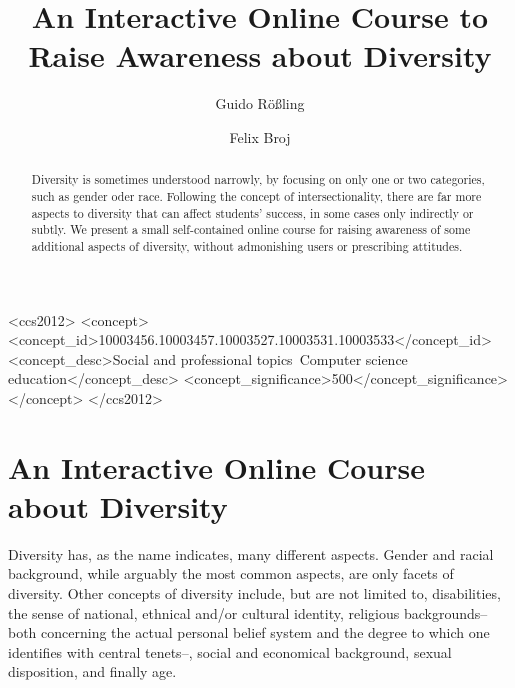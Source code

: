 \documentclass[sigconf]{acmart}
\begin{document}

\title{An Interactive Online Course to Raise Awareness about Diversity}

\author{Guido R\"o\ss{}ling}
\author{Felix Broj}
\begin{CCSXML}
<ccs2012>
<concept>
<concept_id>10003456.10003457.10003527.10003531.10003533</concept_id>
<concept_desc>Social and professional topics~Computer science education</concept_desc>
<concept_significance>500</concept_significance>
</concept>
</ccs2012>
\end{CCSXML}


\begin{abstract}
Diversity is sometimes understood narrowly, by focusing on only one or two categories, such as gender oder race.
Following the concept of intersectionality, there are far more aspects to diversity that can affect students' success,
in some cases only indirectly or subtly. We present a small self-contained online course for raising awareness of
some additional aspects of diversity, without admonishing users or prescribing attitudes.
\end{abstract}

\maketitle

\section{An Interactive Online Course about Diversity}

Diversity has, as the name indicates, many different aspects. Gender and racial background, while arguably the most
common aspects, are only facets of diversity. Other concepts of diversity include, but are not limited to, disabilities, the sense of
national, ethnical and/or cultural identity, religious backgrounds--both concerning the actual personal belief system
and the degree to which one identifies with central tenets--, social and economical background, sexual disposition, and
finally age.
\end{document}
